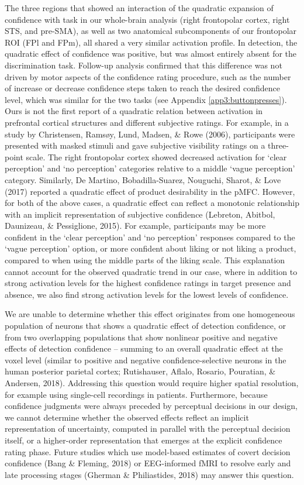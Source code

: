 \documentclass[12pt,twoside]{reedthesis}
\begin{document}
The three regions that showed an interaction of the quadratic expansion of confidence with task in our whole-brain analysis (right frontopolar cortex, right STS, and pre-SMA), as well as two anatomical subcomponents of our frontopolar ROI (FPl and FPm), all shared a very similar activation profile. In detection, the quadratic effect of confidence was positive, but was almost entirely absent for the discrimination task. Follow-up analysis confirmed that this difference was not driven by motor aspects of the confidence rating procedure, such as the number of increase or decrease confidence steps taken to reach the desired confidence level, which was similar for the two tasks (see Appendix \ref{app3:buttonpresses}). Ours is not the first report of a quadratic relation between activation in prefrontal cortical structures and different subjective ratings. For example, in a study by Christensen, Ramsøy, Lund, Madsen, \& Rowe (2006), participants were presented with masked stimuli and gave subjective visibility ratings on a three-point scale. The right frontopolar cortex showed decreased activation for `clear perception' and `no perception' categories relative to a middle `vague perception' category. Similarly, De Martino, Bobadilla-Suarez, Nouguchi, Sharot, \& Love (2017) reported a quadratic effect of product desirability in the pMFC. However, for both of the above cases, a quadratic effect can reflect a monotonic relationship with an implicit representation of subjective confidence (Lebreton, Abitbol, Daunizeau, \& Pessiglione, 2015). For example, participants may be more confident in the `clear perception' and `no perception' responses compared to the `vague perception' option, or more confident about liking or not liking a product, compared to when using the middle parts of the liking scale. This explanation cannot account for the observed quadratic trend in our case, where in addition to strong activation levels for the highest confidence ratings in target presence and absence, we also find strong activation levels for the lowest levels of confidence.

We are unable to determine whether this effect originates from one homogeneous population of neurons that shows a quadratic effect of detection confidence, or from two overlapping populations that show nonlinear positive and negative effects of detection confidence -- summing to an overall quadratic effect at the voxel level (similar to positive and negative confidence-selective neurons in the human posterior parietal cortex; Rutishauser, Aflalo, Rosario, Pouratian, \& Andersen, 2018). Addressing this question would require higher spatial resolution, for example using single-cell recordings in patients. Furthermore, because confidence judgments were always preceded by perceptual decisions in our design, we cannot determine whether the observed effects reflect an implicit representation of uncertainty, computed in parallel with the perceptual decision itself, or a higher-order representation that emerges at the explicit confidence rating phase. Future studies which use model-based estimates of covert decision confidence (Bang \& Fleming, 2018) or EEG-informed fMRI to resolve early and late processing stages (Gherman \& Philiastides, 2018) may answer this question.
\end{document}
